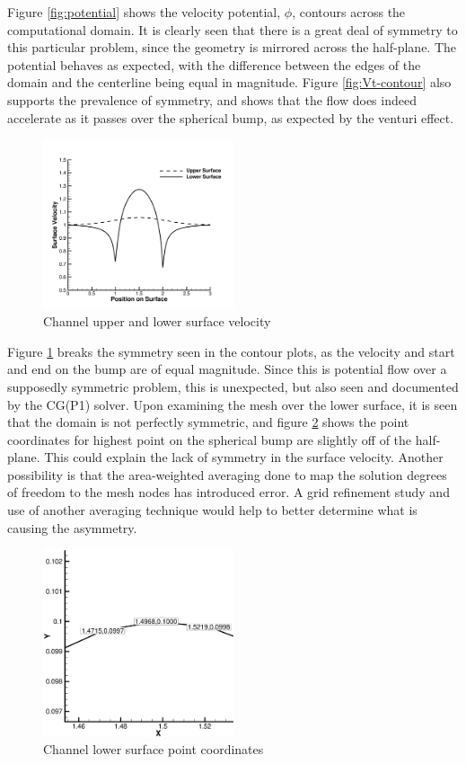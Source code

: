 \documentclass[a4paper]{article}
\begin{document}
Figure \ref{fig:potential} shows the velocity potential, $\phi$, contours across
the computational domain.  It is clearly seen that there is a great deal of
symmetry to this particular problem, since the geometry is mirrored across the
half-plane.  The potential behaves as expected, with the difference between the
edges of the domain and the centerline being equal in magnitude.  Figure
\ref{fig:Vt-contour} also supports the prevalence of symmetry, and shows that
the flow does indeed accelerate as it passes over the spherical bump, as
expected by the venturi effect.    
\begin{figure}[h]
  \centering
  \includegraphics[width=0.5\textwidth]{figures/surface_velocity}
  \caption{Channel upper and lower surface velocity}
  \label{fig:surface-velocity}
\end{figure}
Figure \ref{fig:surface-velocity} breaks the
symmetry seen in the contour plots, as the velocity and start and end on the
bump are of equal magnitude.  Since this is potential flow over a supposedly
symmetric problem, this is unexpected, but also seen and documented by the
CG(P1) solver. Upon examining the mesh over the lower surface, it is seen that
the domain is not perfectly symmetric, and figure \ref{fig:lower-surface} shows
the point coordinates for highest point on the spherical bump are slightly off
of the half-plane. This could explain the lack of symmetry in the surface
velocity.  Another possibility is that the area-weighted averaging done to map
the solution degrees of freedom to the mesh nodes has introduced error.  A grid
refinement study and use of another averaging technique would help to better
determine what is causing the asymmetry.
\begin{figure}[h]
  \centering
  \includegraphics[width=0.5\textwidth]{figures/lower_surface}
  \caption{Channel lower surface point coordinates}
  \label{fig:lower-surface}
\end{figure}
\end{document}
